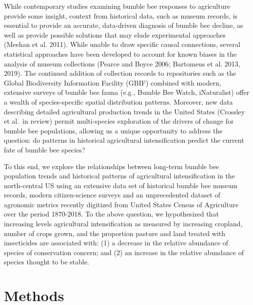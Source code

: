 \documentclass[11pt,]{article}
\begin{document}
While contemporary studies examining bumble bee responses to agriculture
provide some insight, context from historical data, such as museum
records, is essential to provide an accurate, data-driven diagnosis of
bumble bee decline, as well as provide possible solutions that may elude
experimental approaches (Meehan et al. 2011). While unable to draw
specific causal connections, several statistical approaches have been
developed to account for known biases in the analysis of museum
collections (Pearce and Boyce 2006; Bartomeus et al. 2013, 2019). The
continued addition of collection records to repositories such as the
Global Biodiversity Information Facility (GBIF) combined with modern,
extensive surveys of bumble bee fauna (e.g., Bumble Bee Watch,
iNaturalist) offer a wealth of species-specific spatial distribution
patterns. Moreover, new data describing detailed agricultural production
trends in the United States (Crossley et al.~in review) permit
multi-species exploration of the drivers of change for bumble bee
populations, allowing us a unique opportunity to address the question:
do patterns in historical agricultural intensification predict the
current fate of bumble bee species?

To this end, we explore the relationships between long-term bumble bee
population trends and historical patterns of agricultural
intensification in the north-central US using an extensive data set of
historical bumble bee museum records, modern citizen-science surveys and
an unprecedented dataset of agronomic metrics recently digitized from
United States Census of Agriculture over the period 1870-2018. To the
above question, we hypothesized that increasing levels agricultural
intensification as measured by increasing cropland, number of crops
grown, and the proportion pasture and land treated with insecticides are
associated with: (1) a decrease in the relative abundance of species of
conservation concern; and (2) an increase in the relative abundance of
species thought to be stable.

\hypertarget{methods}{%
\section{Methods}\label{methods}}
\end{document}
